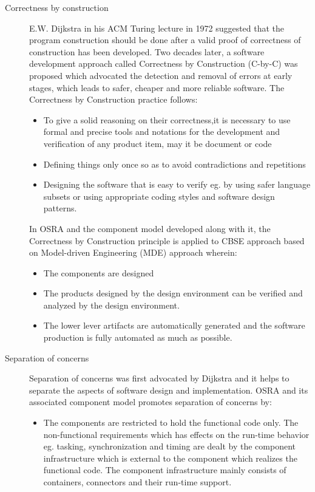 \begin{description}
\item[Correctness by construction] E.W. Dijkstra in his ACM Turing lecture in 1972 suggested that the program construction should be done after a valid proof of correctness of construction has been developed. Two decades later, a software development approach called Correctness by Construction (C-by-C) was proposed which advocated the detection and removal of errors at early stages, which leads to safer, cheaper and more reliable software. The Correctness by Construction practice follows:
\begin{itemize}
\item To give a solid reasoning on their correctness,it is necessary to use formal and precise tools and notations for the development and verification of any product item, may it be document or code
\item Defining things only once so as to avoid contradictions and repetitions
\item Designing the software that is easy to verify eg. by using safer language subsets or using appropriate coding styles and software design patterns. 
\end{itemize}

In OSRA and the component model developed along with it, the Correctness by Construction principle is applied to CBSE approach based on Model-driven Engineering (MDE) approach wherein:

\begin{itemize}
\item The components are designed
\item The products designed by the design environment can be verified and analyzed by the design environment.
\item The lower lever artifacts are automatically generated and the software production is fully automated as much as possible.  
\end{itemize}

\item [Separation of concerns] 
\label{section: Founding principle-Separation of concerns} 
Separation of concerns was first advocated by Dijkstra and it helps to separate the aspects of software design and implementation. OSRA and its associated component model promotes separation of concerns by:

\begin{itemize}
\item The components are restricted to hold the functional code only. The non-functional requirements which has effects on the run-time behavior eg. tasking, synchronization and timing are dealt by the component infrastructure which is external to the component which realizes the functional code. The component infrastructure mainly consists of containers, connectors and their run-time support.


\end{itemize}
\end{description}
